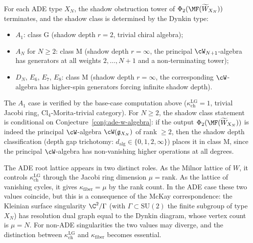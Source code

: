 \begin{conjecture}
\label{conj:mf-ade-shadow-class}
\ClaimStatusConjectured
For each ADE type $X_N$, the shadow obstruction tower of $\Phi_2(\MF(\widetilde{W}_{X_N}))$ terminates, and the shadow class is determined by the Dynkin type:
\begin{itemize}
 \item $A_1$: class G (shadow depth $r = 2$, trivial chiral algebra);
 \item $A_N$ for $N \geq 2$: class M (shadow depth $r = \infty$, the principal $\cW_{N+1}$-algebra has generators at all weights $2, \ldots, N+1$ and a non-terminating tower);
 \item $D_N$, $E_6$, $E_7$, $E_8$: class M (shadow depth $r = \infty$, the corresponding $\cW$-algebra has higher-spin generators forcing infinite shadow depth).
\end{itemize}
The $A_1$ case is verified by the base-case computation above ($\kappa_{\mathrm{ch}}^{\mathrm{LG}} = 1$, trivial Jacobi ring, $\mathrm{Cl}_4$-Morita-trivial category). For $N \geq 2$, the shadow class statement is conditional on Conjecture~\ref{conj:ade-w-algebra}: if the output $\Phi_2(\MF(\widetilde{W}_{X_N}))$ is indeed the principal $\cW$-algebra $\cW(\mathfrak{g}_{X_N})$ of rank $\geq 2$, then the shadow depth classification (depth gap trichotomy: $d_{\mathrm{alg}} \in \{0, 1, 2, \infty\}$) places it in class M, since the principal $\cW$-algebra has non-vanishing higher operations at all degrees.
\end{conjecture}

\begin{remark}
\label{rem:mf-milnor-lattice}
The ADE root lattice appears in two distinct roles. As the Milnor lattice of $W$, it controls $\kappa_{\mathrm{ch}}^{\mathrm{LG}}$ through the Jacobi ring dimension $\mu = \mathrm{rank}$. As the lattice of vanishing cycles, it gives $\kappa_{\mathrm{fiber}} = \mu$ by the rank count. In the ADE case these two values coincide, but this is a consequence of the McKay correspondence: the Kleinian surface singularity $\C^2/\Gamma$ (with $\Gamma \subset \mathrm{SU}(2)$ the finite subgroup of type $X_N$) has resolution dual graph equal to the Dynkin diagram, whose vertex count is $\mu = N$. For non-ADE singularities the two values may diverge, and the distinction between $\kappa_{\mathrm{ch}}^{\mathrm{LG}}$ and $\kappa_{\mathrm{fiber}}$ becomes essential.
\end{remark}

